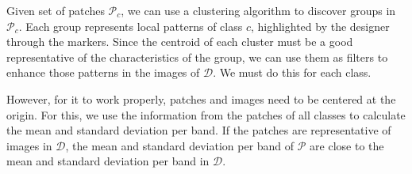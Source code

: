 \documentclass[a4paper,conference]{IEEEtran}
\newcommand{\D}{\mathcal{D}}
\newcommand{\Pa}{\mathcal{P}}
\begin{document}
Given set of patches $\Pa_c$, we can use a clustering algorithm to discover groups in $\Pa_c$. Each group represents local patterns of class $c$, highlighted by the designer through the markers. Since the centroid of each cluster must be a good representative of the characteristics of the group, we can use them as filters to enhance those patterns in the images of $\D$. We must do this for each class.

However, for it to work properly, patches and images need to be centered at the origin. For this, we use the information from the patches of all classes to calculate the mean and standard deviation per band. If the patches are representative of images in $\D$, the mean and standard deviation per band of $\Pa$ are close to the mean and standard deviation per band in $\D$.

\end{document}
